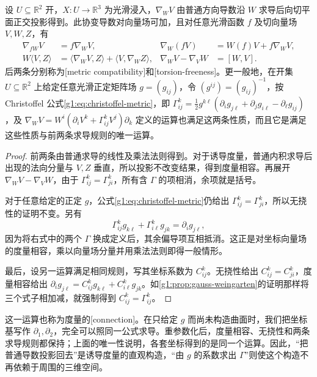 \begin{proposition}
	\label{g1:prop:surface-connection-properties}
	设 \(U\subseteq\mathbb R^2\) 开，\(X:U\to\mathbb R^3\) 为光滑浸入，\(\nabla_WV\) 由普通方向导数沿 \(W\) 求导后向切平面正交投影得到。此协变导数对向量场可加，且对任意光滑函数 \(f\) 及切向量场 \(V,W,Z\)，有
	\begin{align*}
		\nabla_{fW}V&=f\nabla_WV,&
		\nabla_W(fV)&=W(f)V+f\nabla_WV,\\
		W\langle V,Z\rangle&=\langle\nabla_WV,Z\rangle+\langle V,\nabla_WZ\rangle,&
		\nabla_WV-\nabla_VW&=[W,V].
	\end{align*}
	后两条分别称为[metric compatibility]和[torsion-freeness]。更一般地，在开集 \(U\subseteq\mathbb R^2\) 上给定任意光滑正定矩阵场 \(g=(g_{ij})\)，令 \((g^{ij})=(g_{ij})^{-1}\)，按 Christoffel 公式\eqref{g1:eq:christoffel-metric}，即 \(\Gamma^k_{ij}=\tfrac12g^{k\ell}(\partial_i g_{j\ell}+\partial_j g_{i\ell}-\partial_\ell g_{ij})\)，及 \(\nabla_WV=W^i(\partial_iV^k+\Gamma^k_{ij}V^j)\partial_k\) 定义的运算也满足这两条性质，而且它是满足这些性质与前两条求导规则的唯一运算。
\end{proposition}

\begin{proof}
	前两条由普通求导的线性及乘法法则得到。对于诱导度量，普通内积求导后出现的法向分量与 \(V,Z\) 垂直，所以投影不改变结果，得到度量相容。再展开 \(\nabla_WV-\nabla_VW\)，由于 \(\Gamma^k_{ij}=\Gamma^k_{ji}\)，所有含 \(\Gamma\) 的项相消，余项就是括号。

	对于任意给定的正定 \(g\)，公式\eqref{g1:eq:christoffel-metric}仍给出 \(\Gamma^k_{ij}=\Gamma^k_{ji}\)，所以无挠性的证明不变。另有
	\[
		\Gamma^k_{ij}g_{k\ell}+\Gamma^k_{i\ell}g_{jk}
		=\partial_i g_{j\ell},
	\]
	因为将右式中的两个 \(\Gamma\) 换成定义后，其余偏导项互相抵消。这正是对坐标向量场的度量相容，乘以向量场分量并用乘法法则即得一般情形。

	最后，设另一运算满足相同规则，写其坐标系数为 \(C^k_{ij}\)。无挠性给出 \(C^k_{ij}=C^k_{ji}\)，度量相容给出 \(\partial_i g_{j\ell}=C^k_{ij}g_{k\ell}+C^k_{i\ell}g_{jk}\)。如\cref{g1:prop:gauss-weingarten}的证明那样将三个式子相加减，就强制得到 \(C^k_{ij}=\Gamma^k_{ij}\)。
\end{proof}

这一运算也称为度量的[connection]。在只给定 \(g\) 而尚未构造曲面时，我们把坐标基写作 \(\partial_1,\partial_2\)，完全可以照同一公式求导。重参数化后，度量相容、无挠性和两条求导规则都保持；上面的唯一性说明，各套坐标得到的是同一个运算。因此，“把普通导数投影回去”是诱导度量的直观构造，“由 \(g\) 的系数求出 \(\Gamma\)”则使这个构造不再依赖于周围的三维空间。

